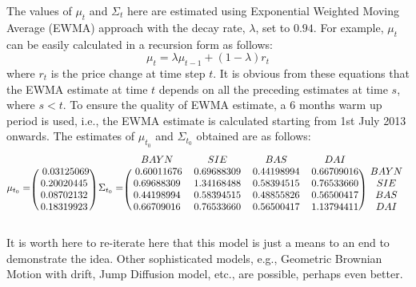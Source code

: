 The values of $\mu_t$ and $\Sigma_t$ here are estimated using Exponential Weighted Moving Average (EWMA) approach with the decay rate, $\lambda$, set to $0.94$. For example, $\mu_t$ can be easily calculated in a recursion form as follows:
\begin{equation}
  \mu_t = \lambda \mu_{t-1} + (1-\lambda) r_{t}
\end{equation}
where $r_t$ is the price change at time step $t$. It is obvious from these equations that the EWMA estimate at time $t$ depends on all the preceding estimates at time $s$, where $s < t$. To ensure the quality of EWMA estimate, a 6 months warm up period is used, i.e., the EWMA estimate is calculated starting from 1st July 2013 onwards. The estimates of $\mu_{t_0}$ and $\Sigma_{t_0}$ obtained are as follows:
\begin{equation}
\mu_{t_0} =
\begin{blockarray}{c}
\\
\begin{block}{(c)}
~ 0.03125069 \\
0.20020445 \\
0.08702132 \\
0.18319923 \\
\end{block}
\end{blockarray}
~\Sigma_{t_0} =
\begin{blockarray}{ccccc}
  BAYN & SIE & BAS & DAI & \\
\begin{block}{(cccc)c}
 ~ 0.60011676 & 0.69688309 & 0.44198994 & 0.66709016 ~ & BAYN \\
0.69688309 & 1.34168488 & 0.58394515 & 0.76533660 & SIE \\
0.44198994 & 0.58394515 & 0.48855826 & 0.56500417 & BAS \\
0.66709016 & 0.76533660 & 0.56500417 & 1.13794411 & DAI \\
\end{block}
\end{blockarray}
\end{equation}
 
It is worth here to re-iterate here that this model is just a means to an end to demonstrate the idea. Other sophisticated models, e.g., Geometric Brownian Motion with drift, Jump Diffusion model, etc., are possible, perhaps even better.

